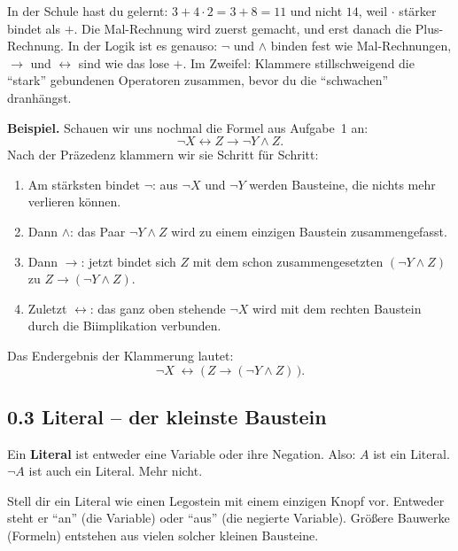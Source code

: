 \documentclass[a4paper,12pt]{article}
\begin{document}
\begin{analogie}[title={Analogie: Punkt-vor-Strich}]
In der Schule hast du gelernt: $3 + 4 \cdot 2 = 3 + 8 = 11$ und nicht
$14$, weil $\cdot$ st\"arker bindet als $+$. Die Mal-Rechnung wird
zuerst gemacht, und erst danach die Plus-Rechnung. In der Logik ist
es genauso: $\neg$ und $\wedge$ binden fest wie Mal-Rechnungen, $\to$
und $\leftrightarrow$ sind wie das lose $+$. Im Zweifel: Klammere
stillschweigend die "`stark"' gebundenen Operatoren zusammen, bevor du
die "`schwachen"' dranh\"angst.
\end{analogie}

\textbf{Beispiel.} Schauen wir uns nochmal die Formel aus Aufgabe~1 an:
\[
\neg X \leftrightarrow Z \to \neg Y \wedge Z.
\]
Nach der Pr\"azedenz klammern wir sie Schritt f\"ur Schritt:
\begin{enumerate}[nosep]
\item Am st\"arksten bindet $\neg$: aus $\neg X$ und $\neg Y$ werden
      Bausteine, die nichts mehr verlieren k\"onnen.
\item Dann $\wedge$: das Paar $\neg Y \wedge Z$ wird zu einem
      einzigen Baustein zusammengefasst.
\item Dann $\to$: jetzt bindet sich $Z$ mit dem schon zusammengesetzten
      $(\neg Y \wedge Z)$ zu $Z \to (\neg Y \wedge Z)$.
\item Zuletzt $\leftrightarrow$: das ganz oben stehende
      $\neg X$ wird mit dem rechten Baustein durch die Biimplikation
      verbunden.
\end{enumerate}
Das Endergebnis der Klammerung lautet:
\[
\neg X \;\leftrightarrow\; \bigl(\,Z \to (\neg Y \wedge Z)\,\bigr).
\]

\subsection*{0.3 Literal -- der kleinste Baustein}

\begin{merkbox}
Ein \textbf{Literal} ist entweder eine Variable oder ihre Negation.
Also: $A$ ist ein Literal. $\neg A$ ist auch ein Literal. Mehr nicht.
\end{merkbox}

\begin{analogie}
Stell dir ein Literal wie einen Legostein mit einem einzigen Knopf
vor. Entweder steht er "`an"' (die Variable) oder "`aus"' (die
negierte Variable). Gr\"o{\ss}ere Bauwerke (Formeln) entstehen aus
vielen solcher kleinen Bausteine.
\end{analogie}
\end{document}
